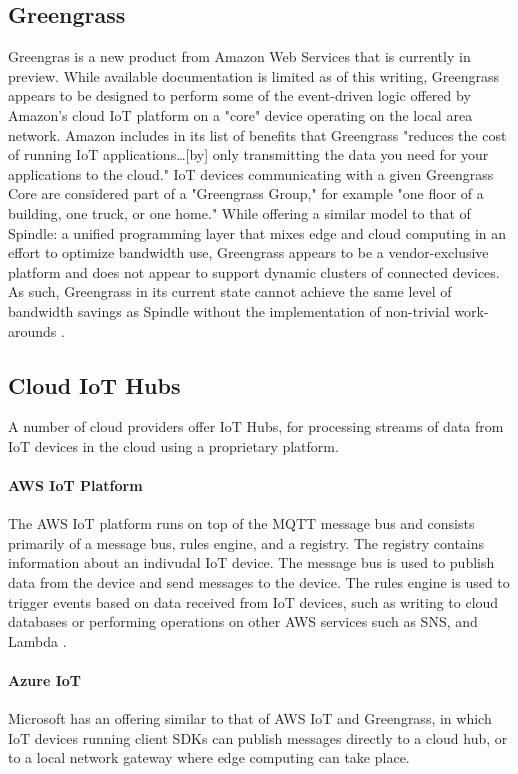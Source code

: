 \documentclass{thesis}
\begin{document}
    \subsection{Greengrass}
        Greengras is a new product from Amazon Web Services that is currently in preview. While available
        documentation is limited as of this writing, Greengrass appears to be designed to perform some of
        the event-driven logic offered by Amazon's cloud IoT platform on a "core" device operating
        on the local area network. Amazon includes in its list of benefits that Greengrass "reduces the 
        cost of running IoT applications\dots [by] only transmitting the data you need for your applications
        to the cloud." IoT devices communicating with a given Greengrass Core are considered part of a
        "Greengrass Group," for example "one floor of a building, one truck, or one home." While offering
        a similar model to that of Spindle: a unified programming layer that mixes edge and cloud computing
        in an effort to optimize bandwidth use, Greengrass appears to be a vendor-exclusive platform and does
        not appear to support dynamic clusters of connected devices. As such, Greengrass in its current state
        cannot achieve the same level of bandwidth savings as Spindle without the implementation of non-trivial
        work-arounds \cite{greengrass}.
    \subsection{Cloud IoT Hubs}
        A number of cloud providers offer IoT Hubs, for processing streams of data from IoT devices in the cloud
        using a proprietary platform. 
        \paragraph{AWS IoT Platform}
           The AWS IoT platform runs on top of the MQTT message bus and consists primarily of a message bus, rules
           engine, and a registry. The registry contains information about an indivudal IoT device. The message bus
           is used to publish data from the device and send messages to the device. The rules engine is used to trigger
           events based on data received from IoT devices, such as writing to cloud databases or performing operations on
           other AWS services such as SNS, and Lambda \cite{aws:iot}.
        \paragraph{Azure IoT}
            Microsoft has an offering similar to that of AWS IoT and Greengrass, in which IoT devices running client SDKs
            can publish messages directly to a cloud hub, or to a local network gateway where edge computing can take
            place.
\end{document}
